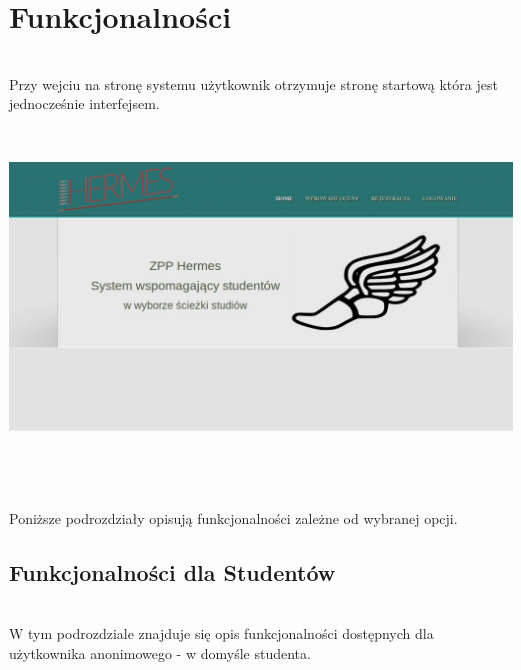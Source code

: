 \documentclass[licencjacka]{pracamgr}
\begin{document}
\chapter{Funkcjonalności}
~\\ \indent
Przy wejciu na stronę systemu użytkownik otrzymuje stronę startową która jest jednocześnie interfejsem. \\ \par
~\\
\begin{minipage}{\linewidth}
	 \centering
           \includegraphics[scale=0.5]{home.jpg}
\end{minipage} \\ \\ \\

 Poniższe podrozdziały opisują funkcjonalności zależne od wybranej opcji.

\section{Funkcjonalności dla Studentów}
~\\ \indent
W tym podrozdziale znajduje się opis funkcjonalności dostępnych dla użytkownika anonimowego - w domyśle studenta.
~\\
\end{document}
